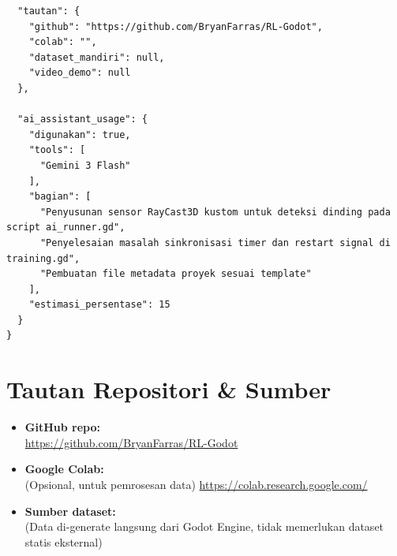 \documentclass[12pt,a4paper]{article}
\begin{document}
\begin{verbatim}
  "tautan": {
    "github": "https://github.com/BryanFarras/RL-Godot",
    "colab": "",
    "dataset_mandiri": null,
    "video_demo": null
  },

  "ai_assistant_usage": {
    "digunakan": true,
    "tools": [
      "Gemini 3 Flash"
    ],
    "bagian": [
      "Penyusunan sensor RayCast3D kustom untuk deteksi dinding pada script ai_runner.gd",
      "Penyelesaian masalah sinkronisasi timer dan restart signal di training.gd",
      "Pembuatan file metadata proyek sesuai template"
    ],
    "estimasi_persentase": 15
  }
}

\end{verbatim}

\newpage

\section{Tautan Repositori \& Sumber}

\begin{itemize}
    \item \textbf{GitHub repo:} \\ \url{https://github.com/BryanFarras/RL-Godot}
    \item \textbf{Google Colab:} \\ (Opsional, untuk pemrosesan data) \url{https://colab.research.google.com/}
    \item \textbf{Sumber dataset:} \\ (Data di-generate langsung dari Godot Engine, tidak memerlukan dataset statis eksternal)
\end{itemize}
\end{document}

